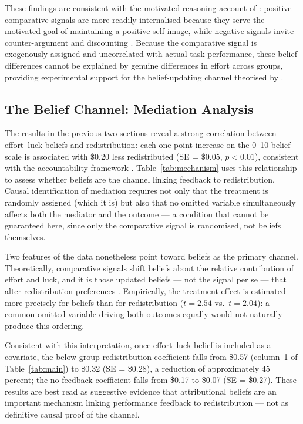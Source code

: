 \documentclass[12pt]{article}
\begin{document}
These findings are consistent with the motivated-reasoning account of
\citet{Kunda1990}: positive comparative signals are more readily
internalised because they serve the motivated goal of maintaining a
positive self-image, while negative signals invite counter-argument and
discounting \citep{Mezulis2004}.
Because the comparative signal is exogenously assigned and uncorrelated
with actual task performance, these belief differences cannot be explained
by genuine differences in effort across groups, providing experimental
support for the belief-updating channel theorised by \citet{Deffains2016}.



\subsection{The Belief Channel: Mediation Analysis}
\label{sec:mediation}

The results in the previous two sections reveal a strong correlation between
effort--luck beliefs and redistribution: each one-point increase on the
0--10 belief scale is associated with \$0.20 less redistributed
(SE = \$0.05, $p < 0.01$), consistent with the accountability framework
\citep{Konow2000, Cappelen2007}.
Table~\ref{tab:mechanism} uses this relationship to assess whether beliefs
are the channel linking feedback to redistribution.
Causal identification of mediation requires not only that the treatment is
randomly assigned (which it is) but also that no omitted variable
simultaneously affects both the mediator and the outcome --- a condition
that cannot be guaranteed here, since only the comparative signal is
randomised, not beliefs themselves.

Two features of the data nonetheless point toward beliefs as the primary
channel.
Theoretically, comparative signals shift beliefs about the relative
contribution of effort and luck, and it is those updated beliefs --- not
the signal per se --- that alter redistribution preferences
\citep{Deffains2016, Kunda1990}.
Empirically, the treatment effect is estimated more precisely for beliefs
than for redistribution ($t = 2.54$ vs.\ $t = 2.04$): a common omitted
variable driving both outcomes equally would not naturally produce this
ordering.

Consistent with this interpretation, once effort--luck belief is included
as a covariate, the below-group redistribution coefficient falls from
\$0.57 (column~1 of Table~\ref{tab:main}) to \$0.32 (SE = \$0.28), a
reduction of approximately 45 percent; the no-feedback coefficient falls
from \$0.17 to \$0.07 (SE = \$0.27).
These results are best read as suggestive evidence that attributional
beliefs are an important mechanism linking performance feedback to
redistribution --- not as definitive causal proof of the channel.
\end{document}
